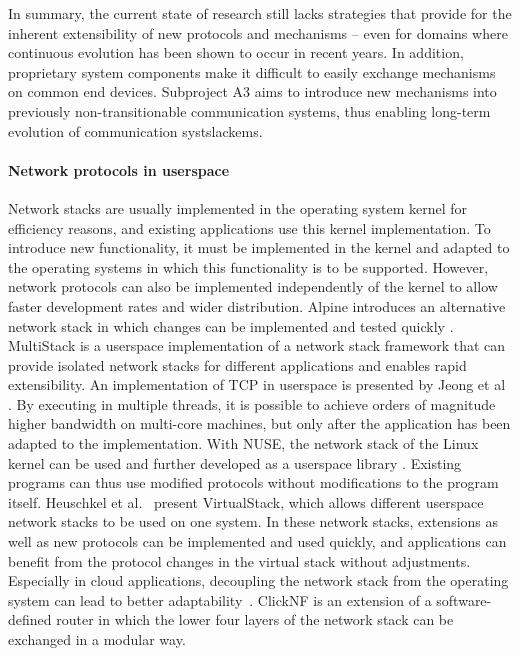In summary, the current state of research still lacks strategies that provide for the inherent extensibility of new protocols and mechanisms -- even for domains where continuous evolution has been shown to occur in recent years. In addition, proprietary system components make it difficult to easily exchange mechanisms on common end devices. Subproject A3 aims to introduce new mechanisms into previously non-transitionable communication systems, thus enabling long-term evolution of communication systslackems.


\paragraph{Network protocols in userspace}
Network stacks are usually implemented in the operating system kernel for efficiency reasons, and existing applications use this kernel implementation. 
To introduce new functionality, it must be implemented in the kernel and adapted to the operating systems in which this functionality is to be supported.
However, network protocols can also be implemented independently of the kernel to allow faster development rates and wider distribution. 
Alpine introduces an alternative network stack in which changes can be implemented and tested quickly \cite{A3:ely2001alpine}.
MultiStack \cite{A3:honda2014rekindling} is a userspace implementation of a network stack framework that can provide isolated network stacks for different applications and enables rapid extensibility. 
An implementation of TCP in userspace is presented by Jeong et al \cite{A3:jeong2014mtcp}.
By executing in multiple threads, it is possible to achieve orders of magnitude higher bandwidth on multi-core machines, but only after the application has been adapted to the implementation.
With NUSE, the network stack of the Linux kernel can be used and further developed as a userspace library \cite{A3:tazaki2015library}. 
Existing programs can thus use modified protocols without modifications to the program itself.
Heuschkel et al.~\cite{A3:heuschkel2016virtualstack} present VirtualStack, which allows different userspace network stacks to be used on one system. 
In these network stacks, extensions as well as new protocols can be implemented and used quickly, and applications can benefit from the protocol changes in the virtual stack without adjustments. 
Especially in cloud applications, decoupling the network stack from the operating system can lead to better adaptability~\cite{A3:niu2017network}.
ClickNF \cite{A3:gallo2018clicknf} is an extension of a software-defined router in which the lower four layers of the network stack can be exchanged in a modular way. 
